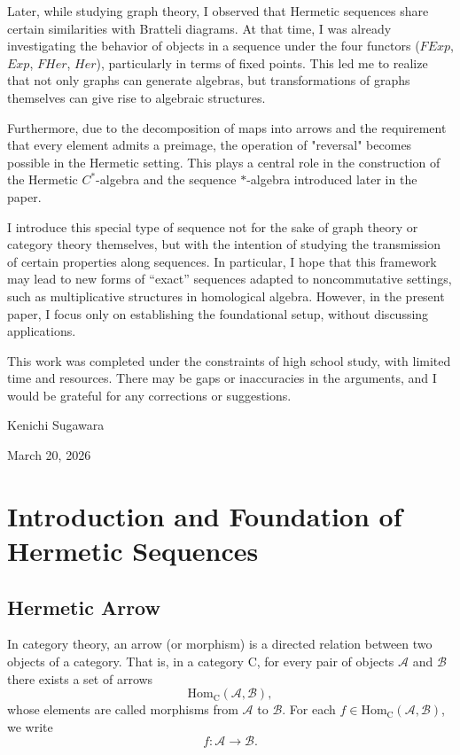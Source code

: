 \documentclass[11pt]{book}
\theoremstyle{definition}
\theoremstyle{plain}
\theoremstyle{remark}
\begin{document}
Later, while studying graph theory, I observed that Hermetic sequences share certain similarities with Bratteli diagrams. At that time, I was already 
investigating the behavior of objects in a sequence under the four functors ($FExp$, $Exp$, $FHer$, $Her$), particularly in terms of fixed points. 
This led me to realize that not only graphs can generate algebras, but transformations of graphs themselves can give rise to algebraic structures.

Furthermore, due to the decomposition of maps into arrows and the requirement that every element admits a preimage, the operation of "reversal" 
becomes possible in the Hermetic setting. This plays a central role in the construction of the Hermetic $C^*$-algebra and the sequence $*$-algebra 
introduced later in the paper.

\medskip
I introduce this special type of sequence not for the sake of graph theory or category theory themselves, but with the intention of studying the 
transmission of certain properties along sequences. In particular, I hope that this framework may lead to new forms of ``exact'' sequences adapted to 
noncommutative settings, such as multiplicative structures in homological algebra. However, in the present paper, I focus only on establishing the 
foundational setup, without discussing applications.

This work was completed under the constraints of high school study, with limited time and resources. There may be gaps or inaccuracies in the arguments, 
and I would be grateful for any corrections or suggestions.
\medskip
\medskip
\begin{flushright}
Kenichi Sugawara

March 20, 2026
\end{flushright}

\chapter{Introduction and Foundation of Hermetic Sequences}
\section{Hermetic Arrow}
In category theory, an arrow (or morphism) is a directed relation between two objects of a category. 
That is, in a category $\mathrm{C}$, for every pair of objects $\mathcal{A}$ and $\mathcal{B}$ there 
exists a set of arrows
\[
\mathrm{Hom}_{\mathrm{C}}(\mathcal{A},\mathcal{B}),
\]
whose elements are called morphisms from $\mathcal{A}$ to $\mathcal{B}$. 
For each $f \in \mathrm{Hom}_{\mathrm{C}}(\mathcal{A},\mathcal{B})$, we write
\[
f: \mathcal{A} \rightarrow \mathcal{B}.
\]
\end{document}
